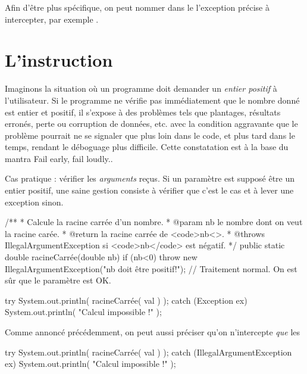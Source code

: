 Afin d'être plus spécifique, on peut nommer dans le  l'exception précise à intercepter, par exemple .


\section{L'instruction }
Imaginons la situation où un programme doit demander un \emph{entier positif} à l'utilisateur.
Si le programme ne vérifie pas immédiatement que le nombre donné est entier et positif, il s'expose à des problèmes tels que plantages, résultats erronés, perte ou corruption de données, etc.
avec la condition aggravante que le problème pourrait ne se signaler que plus loin dans le code, et plus tard dans le temps, rendant le déboguage plus difficile.
Cette constatation est à la base du mantra \og Fail early, fail loudly.\fg.

Cas pratique : vérifier les \emph{arguments} reçus.
Si un paramètre est supposé être un entier positif, une saine gestion consiste à vérifier que c'est le cas et à lever une exception sinon.

\begin{java}
  /**
   * Calcule la racine carrée d'un nombre.
   * @param nb le nombre dont on veut la racine carée.
   * @return la racine carrée de <code>nb<\code>.
   * @throws IllegalArgumentException si <code>nb</code> est négatif.
   */
  public static double racineCarrée(double nb) {
    if (nb<0) {
      throw new IllegalArgumentException("nb doit être positif!");
    }
    // Traitement normal. On est sûr que le paramètre est OK.
  }
\end{java}


\begin{java}
  try {
    System.out.println( racineCarrée( val ) );
  } catch (Exception ex) {
    System.out.println( "Calcul impossible !" );
  }
\end{java}

Comme annoncé précédemment, on peut aussi préciser qu'on n'intercepte \emph{que} les 
\begin{java}
  try {
    System.out.println( racineCarrée( val ) );
  } catch (IllegalArgumentException ex) {
    System.out.println( "Calcul impossible !" );
  }
\end{java}




